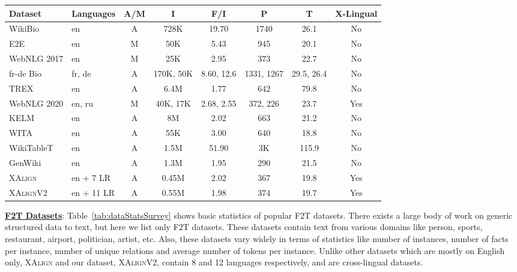 \documentclass[runningheads]{llncs}
\newcommand{\data}{\textsc{XAlignV2}}
\begin{document}
\begin{table*}[!b]
    \centering
    \scriptsize
    \begin{tabular}{|l|l|c|c|c|c|c|c|}
    \hline
Dataset&Languages&A/M&I&F/I&P&T&X-Lingual\\
\hline
\hline
WikiBio&en&A&728K&19.70&1740&26.1&No\\
\hline
E2E&en&M&50K&5.43&945&20.1&No\\
\hline
WebNLG 2017&en&M&25K&2.95&373&22.7&No\\
\hline
fr-de Bio&fr, de&A&170K, 50K&8.60, 12.6&1331, 1267&29.5, 26.4&No\\
\hline
TREX&en&A&6.4M&1.77&642&79.8&No\\
\hline
WebNLG 2020&en, ru&M&40K, 17K&2.68, 2.55&372, 226&23.7 &Yes\\
\hline
KELM&en&A&8M&2.02&663&21.2&No\\
\hline
WITA&en&A&55K&3.00&640&18.8&No\\
\hline
WikiTableT&en&A&1.5M&51.90&3K&115.9&No\\
\hline
GenWiki&en&A&1.3M&1.95&290&21.5&No\\
\hline
\textsc{XAlign}&en + 7 LR&A&0.45M&2.02&367&19.8&Yes\\
\hline
\hline
\data{}&en + 11 LR&A&0.55M&1.98&374&19.7&Yes\\
\hline
    \end{tabular}
    \caption{Statistics of popular Fact-to-Text datasets: WikiBio~\cite{lebret2016wikibio}, E2E~\cite{novikova2017e2e}, WebNLG 2017~\cite{gardent2017webnlg}, WebNLG 2020~\cite{ferreira20202020}, fr-de Bio~\cite{nema2018generating}, KELM~\cite{agarwal2021knowledge}, WITA~\cite{fu2020partially}, WikiTableT~\cite{chen2021wikitablet}, GenWiki~\cite{jin2020genwiki}, TREX~\cite{elsahar2018trex},  XAlign~\cite{abhishek2022xalign}, and \data{} (ours). Alignment method could be A (automatic) or M (manual). I=number of instances. F/I=number of facts per instance. P=number of unique relations. T=average number of tokens per instance.}
    \label{tab:dataStatsSurvey}
\end{table*}

\noindent\underline{\textbf{F2T Datasets}}: Table~\ref{tab:dataStatsSurvey} shows basic statistics of popular F2T datasets. There exists a large body of work on generic structured data to text, but here we list only F2T datasets. These datasets contain text from various domains like person, sports, restaurant, airport, politician, artist, etc. Also, these datasets vary widely in terms of statistics like number of instances, number of facts per instance, number of unique relations and average number of tokens per instance. Unlike other datasets which are mostly on English only, \textsc{XAlign} and our dataset, \data{}, contain 8 and 12 languages respectively, and are cross-lingual datasets. 
\end{document}

